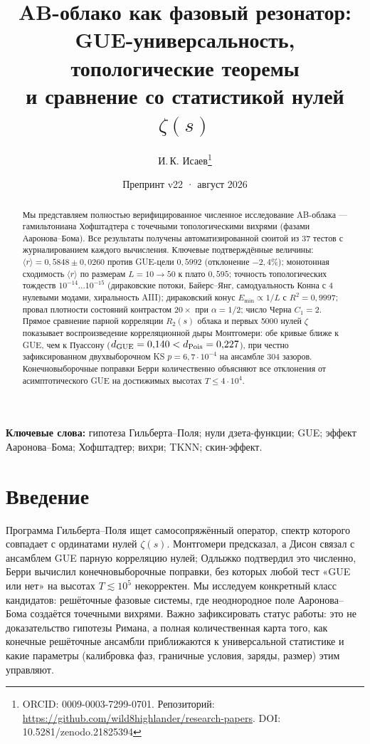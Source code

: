 \documentclass[11pt,a4paper]{article}
\title{\bfseries AB-облако как фазовый резонатор: \\ GUE-универсальность, топологические теоремы \\ и сравнение со статистикой нулей $\zeta(s)$}
\author{И.\,К. Исаев\thanks{ORCID: 0009-0003-7299-0701. Репозиторий: \url{https://github.com/wild8highlander/research-papers}. DOI: 10.5281/zenodo.21825394}}
\date{Препринт v22 · август 2026}
\begin{document}
\maketitle

\begin{abstract}
Мы представляем полностью верифицированное численное исследование AB-облака --- гамильтониана Хофштадтера с точечными топологическими вихрями (фазами Ааронова--Бома). Все результаты получены автоматизированной сюитой из 37 тестов с журналированием каждого вычисления. Ключевые подтверждённые величины: $\langle r\rangle = 0{,}5848\pm0{,}0260$ против GUE-цели $0{,}5992$ (отклонение $-2{,}4\%$); монотонная сходимость $\langle r\rangle$ по размерам $L=10\to50$ к плато $0{,}595$; точность топологических тождеств $10^{-14}\dots10^{-15}$ (дираковские потоки, Байерс--Янг, самодуальность Конна с 4 нулевыми модами, хиральность AIII); дираковский конус $E_{\min}\propto1/L$ с $R^2=0{,}9997$; провал плотности состояний контрастом $20\times$ при $\alpha=1/2$; число Черна $C_1=2$. Прямое сравнение парной корреляции $R_2(s)$ облака и первых 5000 нулей $\zeta$ показывает воспроизведение корреляционной дыры Монтгомери: обе кривые ближе к GUE, чем к Пуассону ($d_{\rm GUE}=0{,}140 < d_{\rm Pois}=0{,}227$), при честно зафиксированном двухвыборочном KS $p=6{,}7\cdot10^{-4}$ на ансамбле 304 зазоров. Конечновыборочные поправки Берри количественно объясняют все отклонения от асимптотического GUE на достижимых высотах $T\le4\cdot10^4$.
\end{abstract}

\noindent\textbf{Ключевые слова:} гипотеза Гильберта--Поля; нули дзета-функции; GUE; эффект Ааронова--Бома; Хофштадтер; вихри; TKNN; скин-эффект.

\section{Введение}
Программа Гильберта--Поля ищет самосопряжённый оператор, спектр которого совпадает с ординатами нулей $\zeta(s)$. Монтгомери \cite{montgomery} предсказал, а Дисон связал с ансамблем GUE парную корреляцию нулей; Одлыжко \cite{odlyzko} подтвердил это численно, Берри \cite{berry} вычислил конечновыборочные поправки, без которых любой тест «GUE или нет» на высотах $T\lesssim10^5$ некорректен. Мы исследуем конкретный класс кандидатов: решёточные фазовые системы, где неоднородное поле Ааронова--Бома создаётся точечными вихрями. Важно зафиксировать статус работы: это не доказательство гипотезы Римана, а полная количественная карта того, как конечные решёточные ансамбли приближаются к универсальной статистике и какие параметры (калибровка фаз, граничные условия, заряды, размер) этим управляют.
\end{document}
